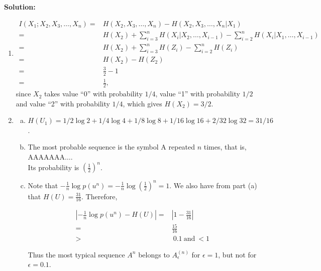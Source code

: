 \documentclass[12pt]{article}
\begin{document}
\begin{enumerate}
\begin{enumerate}[1)]
\end{enumerate}

\vskip 0.2in
\begin{solution}
{\bf Solution:}\\

\begin{enumerate}[1)]
\item 

\begin{align*}
I(X_1; X_2, X_3, \ldots, X_n) =& H(X_2,X_3, \ldots, X_n) - H(X_2, X_3, \ldots, X_n | X_1)  \\
=& H(X_2) + \sum_{i=3}^n H(X_i|X_2, \ldots, X_{i-1}) - \sum_{i=2}^n H(X_i|X_1, \ldots, X_{i-1})\\
=& H(X_2) + \sum_{i=3}^n H(Z_i) - \sum_{i=2}^n H(Z_i)\\
=& H(X_2) - H(Z_2)\\
=& \frac{3}{2} - 1\\
=& \frac{1}{2},
\end{align*}
since $X_2$ takes value ``0'' with probability $1/4$, value ``1'' with probability $1/2$ and value ``2'' with probability $1/4$, which gives $H(X_2) = 3/2$.

\item 
\begin{enumerate}[(a)]
\item $H(U_1) = 1/2 \log 2 + 1/4 \log 4 + 1/8 \log 8 + 1/16 \log 16 + 2/32 \log 32 = 31/16$.  
\item The most probable sequence is the symbol A repeated $n$ times, that is, AAAAAAA$\ldots$. \\
Its probability is $(\frac{1}{2})^n$.
\item Note that $-\frac{1}{n} \log p(u^n) = -\frac{1}{n} \log (\frac{1}{2})^n = 1$. We also have from part (a) that $H(U) = \frac{31}{16}$. Therefore,

\begin{align*}
\left| -\frac{1}{n} \log p(u^n) - H(U) \right| =& \left| 1 - \frac{31}{16} \right| \\
=& \frac{15}{16}\\
>& \ 0.1 \ \text{and} \ < 1
\end{align*}

Thus the most typical sequence $A^n$ belongs to $A_\epsilon^{(n)}$ for $\epsilon = 1$, but not for $\epsilon = 0.1$.



\end{enumerate}



\end{enumerate}
\end{solution}
\end{enumerate}
\end{document}
